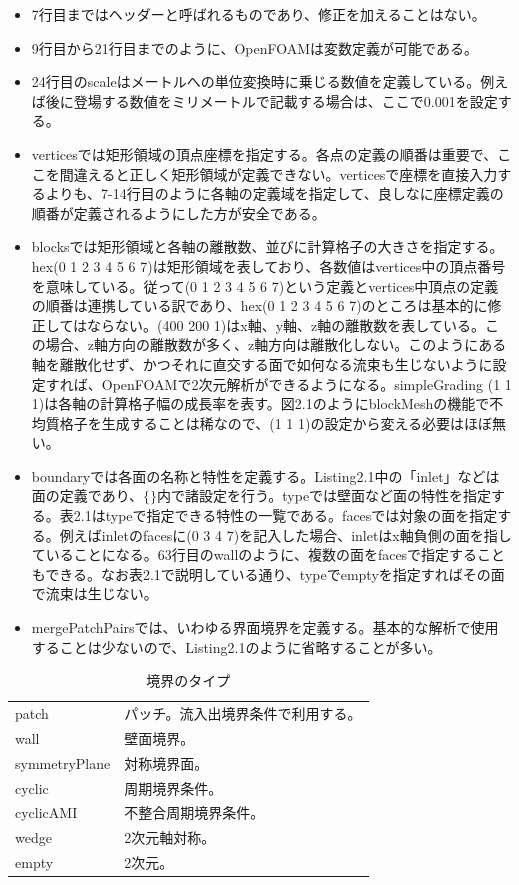 \documentclass[dvipdfmx, 9pt, a4paper]{jsarticle}
\numberwithin{equation}{section}
\begin{document}
\begin{itemize}
\item 7行目まではヘッダーと呼ばれるものであり、修正を加えることはない。
\item 9行目から21行目までのように、OpenFOAMは変数定義が可能である。
\item 24行目のscaleはメートルへの単位変換時に乗じる数値を定義している。例えば後に登場する数値をミリメートルで記載する場合は、ここで0.001を設定する。
\item verticesでは矩形領域の頂点座標を指定する。各点の定義の順番は重要で、ここを間違えると正しく矩形領域が定義できない。verticesで座標を直接入力するよりも、7-14行目のように各軸の定義域を指定して、良しなに座標定義の順番が定義されるようにした方が安全である。
\item blocksでは矩形領域と各軸の離散数、並びに計算格子の大きさを指定する。hex(0 1 2 3 4 5 6 7)は矩形領域を表しており、各数値はvertices中の頂点番号を意味している。従って(0 1 2 3 4 5 6 7)という定義とvertices中頂点の定義の順番は連携している訳であり、hex(0 1 2 3 4 5 6 7)のところは基本的に修正してはならない。(400 200 1)はx軸、y軸、z軸の離散数を表している。この場合、z軸方向の離散数が多く、z軸方向は離散化しない。このようにある軸を離散化せず、かつそれに直交する面で如何なる流束も生じないように設定すれば、OpenFOAMで2次元解析ができるようになる。simpleGrading (1 1 1)は各軸の計算格子幅の成長率を表す。図2.1のようにblockMeshの機能で不均質格子を生成することは稀なので、(1 1 1)の設定から変える必要はほぼ無い。
\item boundaryでは各面の名称と特性を定義する。Listing2.1中の「inlet」などは面の定義であり、$\{\}$内で諸設定を行う。typeでは壁面など面の特性を指定する。表2.1はtypeで指定できる特性の一覧である。facesでは対象の面を指定する。例えばinletのfacesに(0 3 4 7)を記入した場合、inletはx軸負側の面を指していることになる。63行目のwallのように、複数の面をfacesで指定することもできる。なお表2.1で説明している通り、typeでemptyを指定すればその面で流束は生じない。
\item mergePatchPairsでは、いわゆる界面境界を定義する。基本的な解析で使用することは少ないので、Listing2.1のように省略することが多い。
\end{itemize}

\begin{table}[t]
\begin{center}
\caption{境界のタイプ}
\begin{tabular}{ll} \hline
patch & パッチ。流入出境界条件で利用する。 \\
wall & 壁面境界。\\
symmetryPlane & 対称境界面。\\
cyclic & 周期境界条件。\\
cyclicAMI & 不整合周期境界条件。\\
wedge & 2次元軸対称。\\
empty & 2次元。 \\ \hline
\end{tabular}
\end{center}
\end{table}
\end{document}
